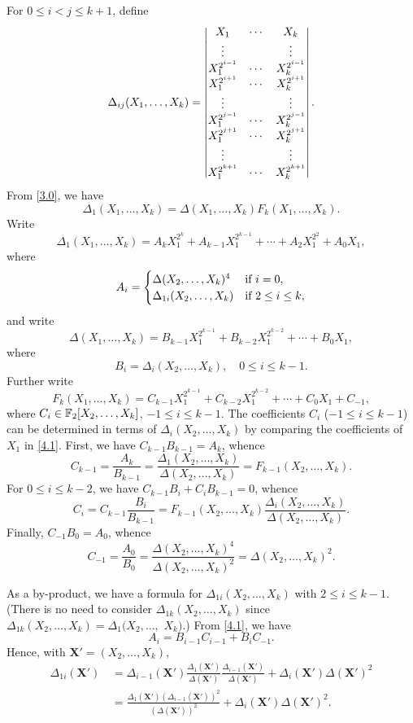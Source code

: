 \documentclass{amsart}
\numberwithin{equation}{section}
\theoremstyle{definition}
\newcommand{\f}{\Bbb F}
\newcommand{\x}{\boldsymbol X}
\begin{document}
For $0\le i<j\le k+1$, define
\[
\Delta_{ij}(X_1,\dots,X_k)=\left|
\begin{matrix}
X_1&\cdots&X_k\cr
\vdots&&\vdots\cr
X_1^{2^{i-1}}&\cdots&X_k^{2^{i-1}}\cr
X_1^{2^{i+1}}&\cdots&X_k^{2^{i+1}}\cr
\vdots&&\vdots\cr
X_1^{2^{j-1}}&\cdots&X_k^{2^{j-1}}\cr
X_1^{2^{j+1}}&\cdots&X_k^{2^{j+1}}\cr
\vdots&&\vdots\cr
X_1^{2^{k+1}}&\cdots&X_k^{2^{k+1}}
\end{matrix}\right|.
\]
From \eqref{3.0}, we have
\begin{equation}\label{4.1}
\Delta_1(X_1,\dots,X_k)=\Delta(X_1,\dots,X_k)F_k(X_1,\dots,X_k).
\end{equation}
Write 
\[
\Delta_1(X_1,\dots,X_k)=A_kX_1^{2^k}+A_{k-1}X_1^{2^{k-1}}+\cdots+A_2X_1^{2^2}+A_0X_1,
\]
where
\[
A_i=\begin{cases}
\Delta(X_2,\dots,X_k)^4&\text{if}\ i=0,\cr
\Delta_{1i}(X_2,\dots,X_k)&\text{if}\ 2\le i\le k,
\end{cases}
\]
and write
\[
\Delta(X_1,\dots,X_k)=B_{k-1}X_1^{2^{k-1}}+B_{k-2}X_1^{2^{k-2}}+\cdots+B_0X_1,
\]
where
\[
B_i=\Delta_i(X_2,\dots,X_k),\quad 0\le i\le k-1.
\]
Further write
\begin{equation}\label{4.2}
F_k(X_1,\dots,X_k)=C_{k-1}X_1^{2^{k-1}}+C_{k-2}X_1^{2^{k-2}}+\cdots+C_0X_1+C_{-1},
\end{equation}
where $C_i\in \f_2[X_2,\dots,X_k]$, $-1\le i\le k-1$. The coefficients $C_i$ ($-1\le i\le k-1$) can be determined in terms of $\Delta_i(X_2,\dots,X_k)$ by comparing the coefficients of $X_1$ in \eqref{4.1}. First, we have $C_{k-1}B_{k-1}=A_k$, whence
\begin{equation}\label{4.3}
C_{k-1}=\frac{A_k}{B_{k-1}}=\frac{\Delta_1(X_2,\dots,X_k)}{\Delta(X_2,\dots,X_k)}=F_{k-1}(X_2,\dots,X_k).
\end{equation}
For $0\le i\le k-2$, we have $C_{k-1}B_i+C_iB_{k-1}=0$, whence
\begin{equation}\label{4.4}
C_i=C_{k-1}\frac{B_i}{B_{k-1}}=F_{k-1}(X_2,\dots,X_k)\frac{\Delta_i(X_2,\dots,X_k)}{\Delta(X_2,\dots,X_k)}.
\end{equation}
Finally, $C_{-1}B_0=A_0$, whence
\begin{equation}\label{4.5}
C_{-1}=\frac{A_0}{B_0}=\frac{\Delta(X_2,\dots,X_k)^4}{\Delta(X_2,\dots,X_k)^2}=\Delta(X_2,\dots,X_k)^2.
\end{equation}

As a by-product, we have a formula for $\Delta_{1i}(X_2,\dots,X_k)$ with $2\le i\le k-1$. (There is no need to consider $\Delta_{1k}(X_2,\dots,X_k)$ since $\Delta_{1k}(X_2,\dots,X_k)=\Delta_1(X_2,\dots,$ $X_k)$.) From \eqref{4.1}, we have
\[
A_i=B_{i-1}C_{i-1}+B_iC_{-1}.
\]
Hence, with $\x'=(X_2,\dots,X_k)$,
\begin{align}
\Delta_{1i}(\x')\,&=\Delta_{i-1}(\x')\frac{\Delta_1(\x')}{\Delta(\x')}\frac{\Delta_{i-1}(\x')}{\Delta(\x')}+\Delta_i(\x')\Delta(\x')^2\\ \label{4.6}
&=\frac{\Delta_1(\x')(\Delta_{i-1}(\x'))^2}{(\Delta(\x'))^2}+\Delta_i(\x')\Delta(\x')^2.\nonumber
\end{align}
\end{document}
